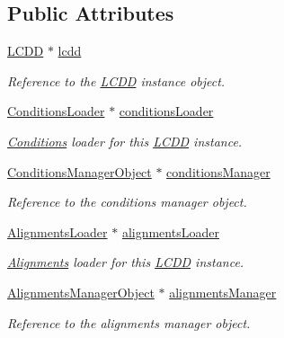 \subsection*{Public Attributes}
\begin{DoxyCompactItemize}
\item 
\hyperlink{class_d_d4hep_1_1_geometry_1_1_l_c_d_d}{LCDD} $\ast$ \hyperlink{class_d_d4hep_1_1_geometry_1_1_world_object_a72d88491949f298897e034e2e5bc74df}{lcdd}
\begin{DoxyCompactList}\small\item\em Reference to the \hyperlink{class_d_d4hep_1_1_geometry_1_1_l_c_d_d}{LCDD} instance object. \item\end{DoxyCompactList}\item 
\hyperlink{class_d_d4hep_1_1_conditions_1_1_conditions_loader}{ConditionsLoader} $\ast$ \hyperlink{class_d_d4hep_1_1_geometry_1_1_world_object_a9c6db420466092543b90e99e38a2727c}{conditionsLoader}
\begin{DoxyCompactList}\small\item\em \hyperlink{namespace_d_d4hep_1_1_conditions}{Conditions} loader for this \hyperlink{class_d_d4hep_1_1_geometry_1_1_l_c_d_d}{LCDD} instance. \item\end{DoxyCompactList}\item 
\hyperlink{class_d_d4hep_1_1_conditions_1_1_conditions_manager_object}{ConditionsManagerObject} $\ast$ \hyperlink{class_d_d4hep_1_1_geometry_1_1_world_object_a325a757896034d63270e1decfc883b8b}{conditionsManager}
\begin{DoxyCompactList}\small\item\em Reference to the conditions manager object. \item\end{DoxyCompactList}\item 
\hyperlink{class_d_d4hep_1_1_alignments_1_1_alignments_loader}{AlignmentsLoader} $\ast$ \hyperlink{class_d_d4hep_1_1_geometry_1_1_world_object_ad14e95056a1b64557678f283364098fa}{alignmentsLoader}
\begin{DoxyCompactList}\small\item\em \hyperlink{namespace_d_d4hep_1_1_alignments}{Alignments} loader for this \hyperlink{class_d_d4hep_1_1_geometry_1_1_l_c_d_d}{LCDD} instance. \item\end{DoxyCompactList}\item 
\hyperlink{class_d_d4hep_1_1_alignments_1_1_alignments_manager_object}{AlignmentsManagerObject} $\ast$ \hyperlink{class_d_d4hep_1_1_geometry_1_1_world_object_a4cd3b67817855becace65515c1df4240}{alignmentsManager}
\begin{DoxyCompactList}\small\item\em Reference to the alignments manager object. \item\end{DoxyCompactList}\end{DoxyCompactItemize}


